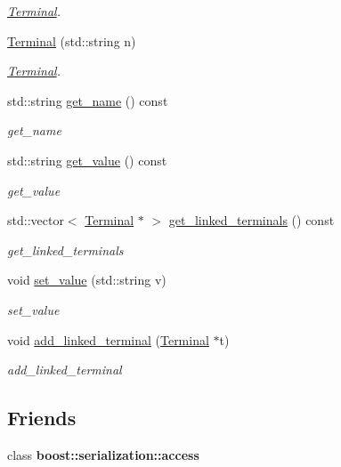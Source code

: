 \begin{DoxyCompactItemize}
\begin{DoxyCompactList}\small\item\em \hyperlink{class_terminal}{Terminal}. \end{DoxyCompactList}\item 
\hyperlink{class_terminal_a528fbc18108f9396d969775453851efe}{Terminal} (std\+::string n)
\begin{DoxyCompactList}\small\item\em \hyperlink{class_terminal}{Terminal}. \end{DoxyCompactList}\item 
std\+::string \hyperlink{class_terminal_a79757bf237bac0a7d988ca61938f2bec}{get\+\_\+name} () const 
\begin{DoxyCompactList}\small\item\em get\+\_\+name \end{DoxyCompactList}\item 
std\+::string \hyperlink{class_terminal_a74dc0c5c76ec9a03f2efed4dae74b7a5}{get\+\_\+value} () const 
\begin{DoxyCompactList}\small\item\em get\+\_\+value \end{DoxyCompactList}\item 
std\+::vector$<$ \hyperlink{class_terminal}{Terminal} $\ast$ $>$ \hyperlink{class_terminal_a9ca76f85961beb83450055da4e559b48}{get\+\_\+linked\+\_\+terminals} () const 
\begin{DoxyCompactList}\small\item\em get\+\_\+linked\+\_\+terminals \end{DoxyCompactList}\item 
void \hyperlink{class_terminal_a2772ca04d4b5e6f468eaa8fca866c171}{set\+\_\+value} (std\+::string v)
\begin{DoxyCompactList}\small\item\em set\+\_\+value \end{DoxyCompactList}\item 
void \hyperlink{class_terminal_a46b1e64649f14e8443403f9ef8aa6342}{add\+\_\+linked\+\_\+terminal} (\hyperlink{class_terminal}{Terminal} $\ast$t)
\begin{DoxyCompactList}\small\item\em add\+\_\+linked\+\_\+terminal \end{DoxyCompactList}\end{DoxyCompactItemize}
\subsection*{Friends}
\begin{DoxyCompactItemize}
\item 
class {\bfseries boost\+::serialization\+::access}\hypertarget{class_terminal_ac98d07dd8f7b70e16ccb9a01abf56b9c}{}\label{class_terminal_ac98d07dd8f7b70e16ccb9a01abf56b9c}

\end{DoxyCompactItemize}


